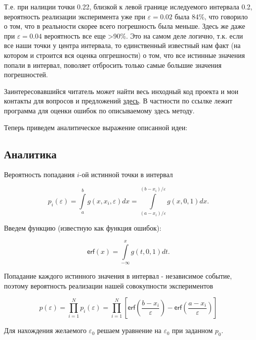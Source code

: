 \documentclass[a4paper,12pt]{article} %
\begin{document}
Т.е. при налиции точки 0.22, близкой к левой границе иследуемого интервала 0.2, вероятность реализации эксперимента уже при $\varepsilon = 0.02$ была 84\%, что говорило о том, что в реальности скорее всего погрешность была меньше. Здесь же даже при $\varepsilon = 0.04$ вероятность все еще >90\%. Это на самом деле логично, т.к. если все наши точки у центра интервала, то единственный известный нам факт (на котором и строится вся оценка опгрешности) о том, что все истинные значения попали в интервал, поволяет отбросить только самые большие значения погрешностей.

Заинтересовавшийся читатель может найти весь инходный код проекта и мои контакты для вопросов и предложений \href{https://github.com/PolyachenkoYA/errorEstimationIOGT}{здесь}. В частности по ссылке лежит программа для оценки ошибок по описываемому здесь методу.

Теперь приведем аналитическое выражение описанной идеи:

\newpage

\subsection{Аналитика}

Вероятность попадания $i$-ой истинной точки в интервал

\begin{equation}
p_i(\varepsilon) = \int\limits_a^b g \left(x, x_i, \varepsilon \right) dx = \int\limits_{(a-x_i)/\varepsilon}^{(b-x_i)/\varepsilon} g(x, 0, 1) dx.
\end{equation}

Введем функцию (известную как функция ошибок):

\begin{equation}
\textsf{erf}(x) = \int\limits_{- \infty}^x g(t, 0, 1) dt.
\end{equation}

Попадание каждого истинного значения в интервал - независимое событие, поэтому вероятность реализации нашей совокупности экспериментов

\begin{equation}
p(\varepsilon) = \prod_{i = 1}^N p_i(\varepsilon) = \prod_{i = 1}^N \left[ \textsf{erf} \left( \dfrac{b - x_i}{\varepsilon} \right) - \textsf{erf} \left( \dfrac{a - x_i}{\varepsilon} \right) \right]
\end{equation}

Для нахождения желаемого $\varepsilon_0$ решаем уравнение на $\varepsilon_0$ при заданном $p_0$.
\end{document}
